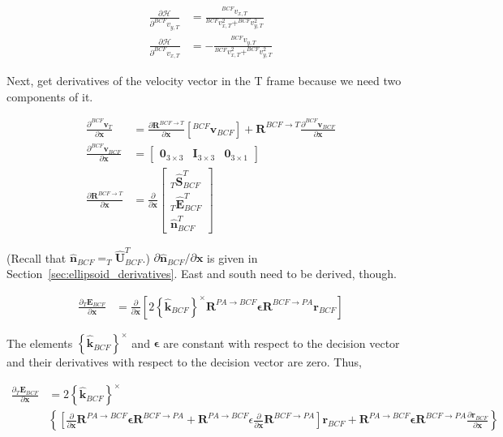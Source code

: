 \documentclass[]{article}
\newcommand{\vb}[1]{\bm{#1}} %
\newcommand{\vbh}[1]{\hat{\bm{#1}}} %
\newcommand{\pd}[2]{\frac{\partial #1}{\partial #2}} %
\begin{document}
\begin{align}
	\pd{\mathcal{H}}{^{BCF} {v}_{y, T}} &= \frac{^{BCF} v_{x, T}}{^{BCF} v_{x, T}^2 + ^{BCF} v_{y, T}^2} \\
	\pd{\mathcal{H}}{^{BCF} {v}_{x, T}} &= - \frac{^{BCF} v_{y, T}}{^{BCF} v_{x, T}^2 + ^{BCF} v_{y, T}^2}
\end{align}

Next, get derivatives of the velocity vector in the T frame because we need two components of it.

\begin{align}
	\label{eq:v_topo_wrt_bcf_derivative}
	\pd{^{BCF} \vb{v}_T}{\vb{x}} &= \pd{\vb{R}^{BCF \rightarrow T}}{\vb{x}} \left[ ^{BCF} \vb{v}_{BCF} \right] + \vb{R}^{BCF \rightarrow T} \pd{^{BCF} \vb{v}_{BCF}}{\vb{x}} \\
	\pd{^{BCF} \vb{v}_{BCF}}{\vb{x}} &= \left[ \begin{array}{ccc}
		\vb{0}_{3 \times 3} & \vb{I}_{3 \times 3} & \vb{0}_{3 \times 1} \end{array} \right] \\
	\label{eq:R_bcf2t_derivative}
	\pd{\vb{R}^{BCF \rightarrow T}}{\vb{x}} &= \pd{}{\vb{x}} \left[ \begin{array}{c}
	_T \vbh{S}_{BCF}^T \\
	_T \vbh{E}_{BCF}^T \\
	\vbh{n}_{BCF}^T
	\end{array} \right]
\end{align}

\noindent (Recall that $\vbh{n}_{BCF} = _T \vbh{U}_{BCF}^T$.) $\partial \vbh{n}_{BCF} / \partial \vb{x}$ is given in Section~\ref{sec:ellipsoid_derivatives}. East and south need to be derived, though.

\begin{align}
	\pd{_T \vb{E}_{BCF}}{\vb{x}} &= \pd{}{\vb{x}} \left[ 2 \left\{ \vbh{k}_{BCF} \right\}^{\times} \vb{R}^{PA \rightarrow BCF} \vb{\epsilon} \vb{R}^{BCF \rightarrow PA} \vb{r}_{BCF} \right]
\end{align}

The elements $\left\{ \vbh{k}_{BCF} \right\}^{\times}$ and $\vb{\epsilon}$ are constant with respect to the decision vector and their derivatives with respect to the decision vector are zero. Thus,

\begin{align}
\label{eq:d_east_dx_topo_bcf}
	\pd{_T \vb{E}_{BCF}}{\vb{x}} &= 2 \left\{ \vbh{k}_{BCF} \right\}^{\times} \\
	& \left\{ \left[ \pd{}{\vb{x}} \vb{R}^{PA \rightarrow BCF} \vb{\epsilon} \vb{R}^{BCF \rightarrow PA} +\vb{R}^{PA \rightarrow BCF} \epsilon \pd{}{\vb{x}} \vb{R}^{BCF \rightarrow PA} \right] \vb{r}_{BCF} + \vb{R}^{PA \rightarrow BCF} \vb{\epsilon} \vb{R}^{BCF \rightarrow PA} \pd{\vb{r}_{BCF}}{\vb{x}} \right\}
\end{align}
\end{document}
